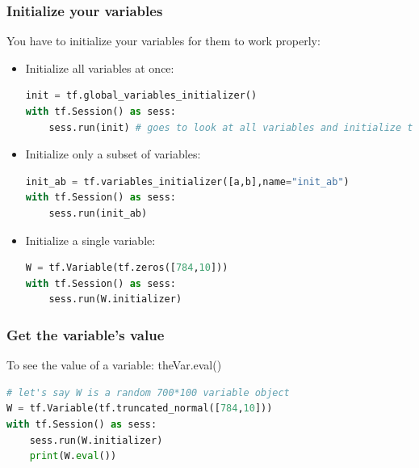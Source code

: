 \documentclass{article}
\begin{document}
	\subsubsection{Initialize your variables}	
	You have to initialize your variables for them to work properly:
	\begin{itemize}
	\item Initialize all variables at once:
\begin{lstlisting}[language=Python,morekeywords ={as}]
init = tf.global_variables_initializer()
with tf.Session() as sess:
	sess.run(init) # goes to look at all variables and initialize them
\end{lstlisting}
	\item Initialize only a subset of variables:
\begin{lstlisting}[language=Python,morekeywords ={as}]
init_ab = tf.variables_initializer([a,b],name="init_ab")
with tf.Session() as sess:
	sess.run(init_ab)
\end{lstlisting}
	\item Initialize a single variable:
\begin{lstlisting}[language=Python,morekeywords ={as}]
W = tf.Variable(tf.zeros([784,10]))
with tf.Session() as sess:
	sess.run(W.initializer)
\end{lstlisting}
	\end{itemize}	
	\subsubsection{Get the variable's value}
	To see the value of a variable: theVar.eval()
\begin{lstlisting}[language=Python,morekeywords ={as}]
# let's say W is a random 700*100 variable object
W = tf.Variable(tf.truncated_normal([784,10]))
with tf.Session() as sess:
	sess.run(W.initializer)
	print(W.eval())
\end{lstlisting}
\end{document}

